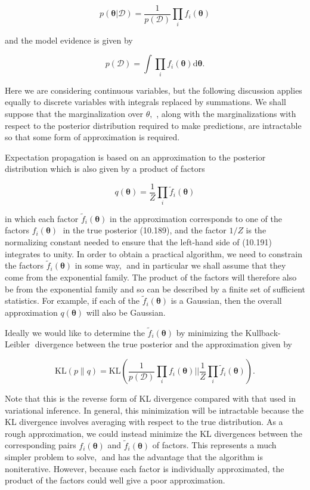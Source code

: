 \documentclass[
  10
]{article}
\begin{document}
\[
p (\pmb {\theta} | \mathcal {D}) = \frac {1}{p (\mathcal {D})} \prod_ {i} f _ {i} (\pmb {\theta})\tag{10.189}
\]

and the model evidence is given by

\[
p (\mathcal {D}) = \int \prod_ {i} f _ {i} (\boldsymbol {\theta}) \mathrm{d} \boldsymbol {\theta}.\tag{10.190}
\]

Here we are considering continuous variables, but the following
discussion applies equally to discrete variables with integrals replaced
by summations. We shall suppose that the marginalization over
\(\theta ,\) , along with the marginalizations with respect to the
posterior distribution required to make predictions, are intractable so
that some form of approximation is required.

Expectation propagation is based on an approximation to the posterior
distribution which is also given by a product of factors

\[
q (\pmb {\theta}) = \frac {1}{Z} \prod_ {i} \widetilde {f} _ {i} (\pmb {\theta})\tag{10.191}
\]

in which each factor \(\widetilde { f } _ { i } ( \pmb \theta )\) in the
approximation corresponds to one of the factors
\(f _ { i } ( \pmb \theta )\) in the true posterior (10.189), and the
factor \(1 / Z\) is the normalizing constant needed to ensure that the
left-hand side of (10.191) integrates to unity. In order to obtain a
practical algorithm, we need to constrain the factors
\(\widetilde { f } _ { i } ( \pmb \theta )\) in some way, and in
particular we shall assume that they come from the exponential family.
The product of the factors will therefore also be from the exponential
family and so can be described by a finite set of sufficient statistics.
For example, if each of the \(\widetilde { f } _ { i } ( \pmb \theta )\)
is a Gaussian, then the overall approximation \(q ( \pmb \theta )\) will
also be Gaussian.

Ideally we would like to determine the
\(\widetilde { f } _ { i } ( \pmb \theta )\) by minimizing the
Kullback-Leibler divergence between the true posterior and the
approximation given by

\[
\mathrm{KL} \left(p \| q\right) = \mathrm{KL} \left(\frac {1}{p (\mathcal {D})} \prod_ {i} f _ {i} (\boldsymbol {\theta}) \Bigg | \Bigg | \frac {1}{Z} \prod_ {i} \widetilde {f} _ {i} (\boldsymbol {\theta})\right).\tag{10.192}
\]

Note that this is the reverse form of KL divergence compared with that
used in variational inference. In general, this minimization will be
intractable because the KL divergence involves averaging with respect to
the true distribution. As a rough approximation, we could instead
minimize the KL divergences between the corresponding pairs
\(f _ { i } ( \pmb \theta )\) and
\(\widetilde { f } _ { i } ( \pmb \theta )\) of factors. This represents
a much simpler problem to solve, and has the advantage that the
algorithm is noniterative. However, because each factor is individually
approximated, the product of the factors could well give a poor
approximation.
\end{document}
